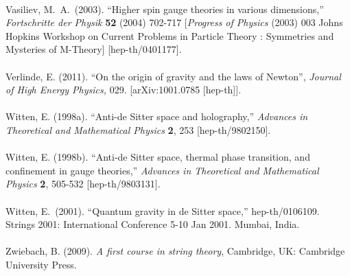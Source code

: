 \documentclass[12pt]{article}
\renewcommand{\^}[1]{\hat{#1}}
\begin{document}
\\
 Vasiliev,  M.~A.~(2003). ``Higher spin gauge theories in various dimensions,''
{\it  Fortschritte der Physik} {\bf 52} (2004) 702-717
   [{\it Progress of Physics} (2003) 003 Johns Hopkins Workshop on Current Problems in Particle Theory : Symmetries and Mysteries of M-Theory]
  [hep-th/0401177].\\
\\
Verlinde, E. (2011). ``On the origin of gravity and the laws of Newton'', {\it Journal of
High Energy Physics,} 029. [arXiv:1001.0785 [hep-th]].\\
\\
Witten, E. (1998a). ``Anti-de Sitter space and holography,''
 {\it Advances in Theoretical and Mathematical Physics} {\bf 2}, 253 
  [hep-th/9802150].\\
\\
Witten, E. (1998b). ``Anti-de Sitter space, thermal phase transition, and confinement in gauge theories,''  
{\it Advances in Theoretical and Mathematical Physics}  {\bf 2}, 505-532 
 [hep-th/9803131].\\
 \\
 Witten, E.~(2001). ``Quantum gravity in de Sitter space,''
  hep-th/0106109. Strings 2001: International Conference 5-10 Jan 2001. Mumbai, India. \\
\\
Zwiebach, B. (2009). {\it A first course in string theory}, Cambridge, UK: Cambridge University Press.
\end{document}
